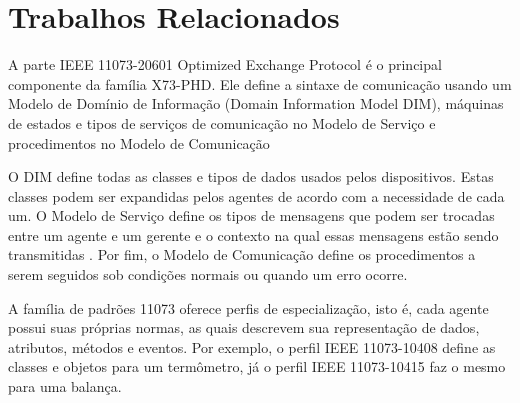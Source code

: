 \section{Trabalhos Relacionados}\label{relatedworks}

A parte IEEE 11073-20601 Optimized Exchange Protocol é o principal componente da família X73-PHD. Ele define a sintaxe de comunicação usando um Modelo de Domínio de Informação (Domain Information Model DIM), máquinas de estados e tipos de serviços de comunicação no Modelo de Serviço e procedimentos no Modelo de Comunicação

O DIM define todas as classes e tipos de dados usados pelos dispositivos. Estas classes podem ser expandidas pelos agentes de acordo com a necessidade de cada um. O Modelo de Serviço define os tipos de mensagens que podem ser trocadas entre um agente e um gerente e o contexto na qual essas mensagens estão sendo transmitidas \cite{b17}. Por fim, o Modelo de Comunicação define os procedimentos a serem seguidos sob condições normais ou quando um erro ocorre.

A família de padrões 11073 oferece perfis de especialização, isto é, cada agente possui suas próprias normas, as quais descrevem sua representação de dados, atributos, métodos e eventos. Por exemplo, o perfil IEEE 11073-10408 define as classes e objetos para um termômetro, já o perfil IEEE 11073-10415 faz o mesmo para uma balança. 

